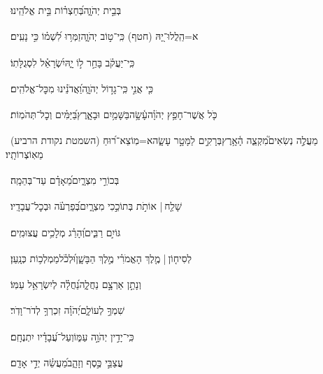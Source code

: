 \documentclass[12pt]{article}
\newcommand{\loc}[1]{\textsuperscript{\locf{#1}}}
\begin{document}
{\loc{ ב}~}‏ בְּבֵ֣ית יְהֹוָ֑ה{\hfill}בְּ֝חַצְר֗וֹת בֵּ֣ית אֱלֹהֵֽינוּ׃\par

{\loc{ ג}~}‏א=הַֽלֲלוּ־יָ֭הּ (חטף) כִּֽי־ט֣וֹב יְהֹוָ֑ה{\hfill}זַמְּר֥וּ לִ֝שְׁמ֗וֹ כִּ֣י נָעִֽים׃\par

{\loc{ ד}~}‏כִּֽי־יַעֲקֹ֗ב בָּחַ֣ר ל֣וֹ יָ֑הּ{\hfill}יִ֝שְׂרָאֵ֗ל לִסְגֻלָּתֽוֹ׃\par

{\loc{ ה}~}‏כִּ֤י אֲנִ֣י  כִּֽי־גָד֣וֹל יְהֹוָ֑ה{\hfill}וַ֝אֲדֹנֵ֗ינוּ מִכׇּל־אֱלֹהִֽים׃\par

{\loc{ ו}~}‏כֹּ֤ל אֲשֶׁר־חָפֵ֥ץ יְהֹוָ֗ה{\hfill}עָ֫שָׂ֥ה\newline\hspace*{.5em}בַּשָּׁמַ֥יִם וּבָאָ֑רֶץ{\hfill}בַּ֝יַּמִּ֗ים וְכׇל־תְּהֹמֽוֹת׃\par

{\loc{ ז}~}‏מַעֲלֶ֣ה נְשִׂאִים֮{\hfill}מִקְצֵ֢ה הָ֫אָ֥רֶץ\newline\hspace*{.5em}בְּרָקִ֣ים לַמָּטָ֣ר עָשָׂ֑ה{\hfill}א=מֽוֹצֵא־ר֝וּחַ (השמטת נקודת הרביע) מֵאֽוֹצְרוֹתָֽיו׃\par

{\loc{ ח}~}‏ בְּכוֹרֵ֣י מִצְרָ֑יִם{\hfill}מֵ֝אָדָ֗ם עַד־בְּהֵמָֽה׃\par

{\loc{ ט}~}‏שָׁלַ֤ח |  אוֹתֹ֣ת  בְּתוֹכֵ֣כִי מִצְרָ֑יִם{\hfill}בְּ֝פַרְעֹ֗ה וּבְכׇל־עֲבָדָֽיו׃\par

{\loc{ י}~}‏ גּוֹיִ֣ם רַבִּ֑ים{\hfill}וְ֝הָרַ֗ג מְלָכִ֥ים עֲצוּמִֽים׃\par

{\loc{ יא}~}‏לְסִיח֤וֹן |  מֶ֤לֶךְ הָאֱמֹרִ֗י{\hfill} מֶ֣לֶךְ הַבָּשָׁ֑ן\newline\hspace*{.5em}וּ֝לְכֹ֗ל{\hfill}מַמְלְכ֥וֹת כְּנָֽעַן׃\par

{\loc{ יב}~}‏וְנָתַ֣ן אַרְצָ֣ם נַחֲלָ֑ה{\hfill}נַ֝חֲלָ֗ה לְיִשְׂרָאֵ֥ל עַמּֽוֹ׃\par

{\loc{ יג}~}‏ שִׁמְךָ֣ לְעוֹלָ֑ם{\hfill}יְ֝הֹוָ֗ה זִכְרְךָ֥ לְדֹר־וָדֹֽר׃\par

{\loc{ יד}~}‏כִּֽי־יָדִ֣ין יְהֹוָ֣ה עַמּ֑וֹ{\hfill}וְעַל־עֲ֝בָדָ֗יו יִתְנֶחָֽם׃\par

{\loc{ טו}~}‏עֲצַבֵּ֣י  כֶּ֣סֶף וְזָהָ֑ב{\hfill}מַ֝עֲשֵׂ֗ה יְדֵ֣י אָדָֽם׃\par
\end{document}
